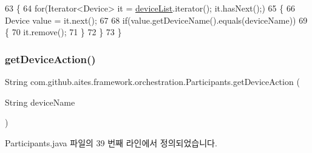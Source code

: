 \begin{DoxyCode}
63                                                \{
64         \textcolor{keywordflow}{for}(Iterator<Device> it = \mbox{\hyperlink{classcom_1_1github_1_1aites_1_1framework_1_1orchestration_1_1_participants_ab90ca1b5cf16aec6e3e6608df4a8d2ad}{deviceList}}.iterator(); it.hasNext();)
65         \{
66             Device value = it.next();
67             
68             \textcolor{keywordflow}{if}(value.getDeviceName().equals(deviceName))
69             \{
70                 it.remove();
71             \}
72         \}
73     \}
\end{DoxyCode}
\mbox{\label{classcom_1_1github_1_1aites_1_1framework_1_1orchestration_1_1_participants_aad2cb3cd7db30459a1ef894f2c9b333f}} 
\subsubsection{\texorpdfstring{get\+Device\+Action()}{getDeviceAction()}}
{\footnotesize\ttfamily String com.\+github.\+aites.\+framework.\+orchestration.\+Participants.\+get\+Device\+Action (\begin{DoxyParamCaption}\item[{String}]{device\+Name }\end{DoxyParamCaption})}



Participants.\+java 파일의 39 번째 라인에서 정의되었습니다.


